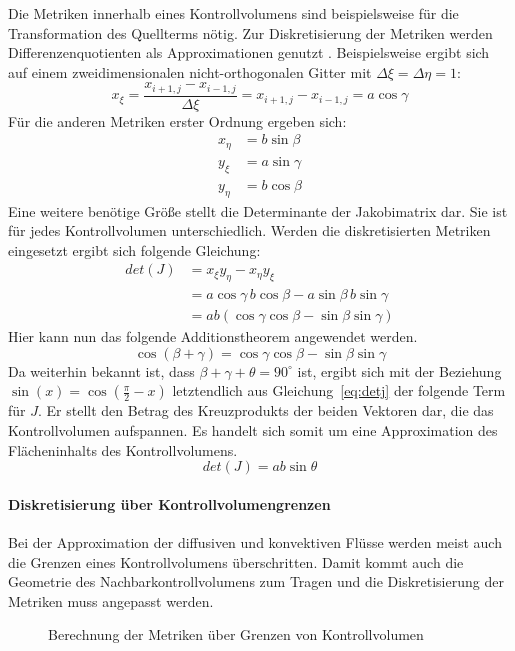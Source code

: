 \noindent
Die Metriken innerhalb eines Kontrollvolumens sind beispielsweise für die Transformation
des Quellterms nötig. Zur Diskretisierung der Metriken werden
Differenzenquotienten als Approximationen genutzt \cite{lee}.
Beispielsweise ergibt sich auf einem zweidimensionalen nicht-orthogonalen
Gitter mit $\Delta\xi = \Delta \eta = 1$:
\begin{equation}
  x_{\xi} = \frac{x_{i+1, j} - x_{i-1,j}}{\Delta \xi} = x_{i+1, j} - x_{i-1,j} = a \cos \gamma
\end{equation}
Für die anderen Metriken erster Ordnung ergeben sich:
\begin{align*}
  x_{\eta} &= b\sin \beta\\
  y_{\xi} &= a \sin \gamma\\
  y_{\eta} &= b \cos \beta
\end{align*}
Eine weitere benötige Größe stellt die Determinante der Jakobimatrix
dar. Sie ist für jedes Kon\-troll\-volumen unterschiedlich. Werden
die diskretisierten Metriken eingesetzt ergibt sich folgende Gleichung:
\begin{align}
  det(J) &= x_{\xi}y_{\eta}-x_{\eta}y_{\xi}\nonumber\\
    &= a \cos \gamma \, b \cos \beta - 
       a \sin \beta \, b \sin \gamma\nonumber\\
       &= ab(\cos\gamma\cos\beta-\sin\beta\sin\gamma)
\end{align}
Hier kann nun das folgende Additionstheorem
angewendet werden.
\begin{equation*}
\cos(\beta+\gamma)=\cos\gamma\cos\beta-\sin\beta\sin\gamma
\end{equation*}
Da weiterhin bekannt ist, dass $\beta+\gamma
+\theta = 90^{\circ}$ ist, ergibt sich mit der Beziehung
$\sin(x)=\cos(\frac{\pi}{2} -x)$ letztendlich aus
Gleichung~\eqref{eq:detj} der folgende Term für $J$. Er stellt den Betrag des
Kreuzprodukts der beiden
Vektoren dar,
die das Kontrollvolumen aufspannen.
Es handelt sich somit um eine Approximation des Flächeninhalts
des Kontrollvolumens.
\begin{equation}
  det(J) = a b \sin \theta
\end{equation}

\paragraph{Diskretisierung über Kontrollvolumengrenzen}

\noindent
Bei der Approximation der diffusiven und konvektiven Flüsse werden meist
auch die Grenzen eines Kontrollvolumens überschritten. Damit kommt auch
die Geometrie des Nachbarkontrollvolumens zum Tragen und die Diskretisierung der
Metriken muss angepasst werden.
\begin{figure}[ht]
  
\centering
\caption{Berechnung der Metriken über Grenzen von Kontrollvolumen}
\end{figure}

